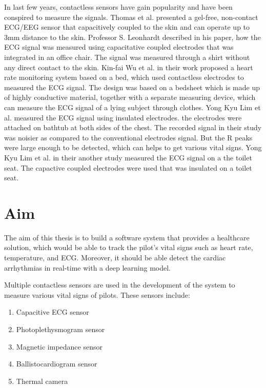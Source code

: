 In last few years, contactless sensors have gain popularity and have been conspired to measure the signals. Thomas et al. \cite{sullivan2007low} presented a gel-free, non-contact ECG/EEG sensor that capacitively coupled to the skin and can operate up to 3mm distance to the skin. Professor S. Leonhardt \cite{aleksandrowicz2007wireless} described in his paper, how the ECG signal was measured using capacitative coupled electrodes that was integrated in an office chair. The signal was measured through a shirt without any direct contact to the skin. Kin-fai Wu et al. \cite{wu2008contactless} in their work proposed a heart rate monitoring system based on a bed, which used contactless electrodes to measured the ECG signal. The design was based on a bedsheet which is made up of highly conductive material, together with a separate measuring device, which can measure the ECG signal of a lying subject through clothes. Yong Kyu Lim et al. \cite{lim2004ecg} measured the ECG signal using insulated electrodes. the electrodes were attached on bathtub at both sides of the chest. The recorded signal in their study was noisier as compared to the conventional electrodes signal. But the R peaks were large enough to be detected, which can helps to get various vital signs. Yong Kyu Lim et al. in their another study \cite{kim2004electrically} measured the ECG signal on a the toilet seat. The capactive coupled electrodes were used that was insulated on a toilet seat.



\section{Aim}

The aim of this thesis is to build a software system that provides a healthcare solution, which would be able to track the pilot's vital signs such as heart rate, temperature, and ECG. Moreover, it should be able detect the cardiac arrhythmias in real-time with a deep learning model.

Multiple contactless sensors are used in the development of the system to measure various vital signs of pilots. These sensors include:

\begin{enumerate}
	\item Capacitive ECG sensor
	\item Photoplethysmogram sensor
	\item Magnetic impedance sensor
	\item Ballistocardiogram sensor
	\item Thermal camera
\end{enumerate}

